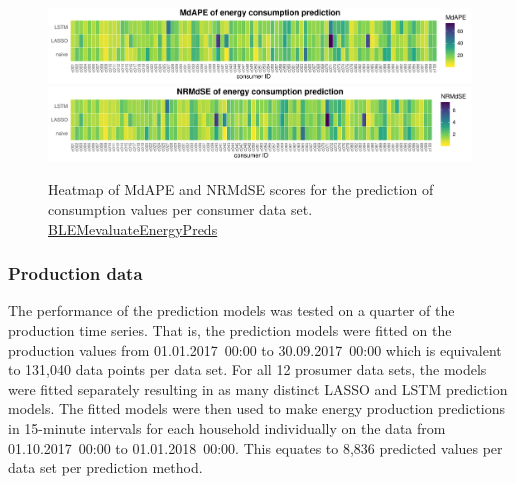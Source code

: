 %
\begin{figure}[htbp]
 \centering
 \includegraphics[width=\textwidth]{thesis/graphs/evaluation/c_heatmap_MdAPE.pdf}
 \includegraphics[width=\textwidth]{thesis/graphs/evaluation/c_heatmap_NRMdSE.pdf}
\caption[Heatmaps of MdAPE and NRMdSE for consumption values]{Heatmap of MdAPE and NRMdSE scores for the prediction of consumption values per consumer data set. \quantnet\href{https://github.com/QuantLet/BLEM/tree/master/BLEMevaluateEnergyPreds}{BLEMevaluateEnergyPreds}}
\label{Fig:heatmaps_median}
\end{figure}
%



\subsubsection{Production data}

The performance of the prediction models was tested on a quarter of the production time series. That is, the prediction models were fitted on the production values from 01.01.2017~00:00 to 30.09.2017~00:00 which is equivalent to 131,040 data points per data set. For all 12 prosumer data sets, the models were fitted separately resulting in as many distinct LASSO and LSTM prediction models. The fitted models were then used to make energy production predictions in 15-minute intervals for each household individually on the data from 01.10.2017~00:00 to 01.01.2018~00:00. This equates to 8,836 predicted values per data set per prediction method.

